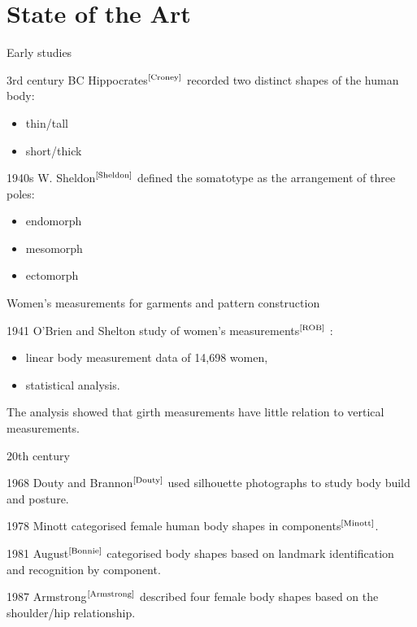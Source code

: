 \documentclass[10pt]{beamer}
\newcommand{\bib}[1]{$^\text{\cite{#1}}$}
\begin{document}
\section{State of the Art}
\begin{frame}{Early studies}
	\begin{block}{3rd century BC}
		Hippocrates\bib{Croney} recorded two distinct shapes of the human body:
		\begin{itemize}
			\item thin/tall
			\item short/thick
		\end{itemize} \pause
	\end{block}\pause
	\begin{block}{1940s}
		W. Sheldon\bib{Sheldon} defined the somatotype as the arrangement of three poles:
		\begin{itemize}
			\item endomorph
			\item mesomorph
			\item ectomorph
		\end{itemize}
	\end{block}
\end{frame}

\begin{frame}{Women's measurements for garments and pattern construction}
	\begin{block}{1941}
		O’Brien and Shelton study of women’s measurements\bib{ROB} :
		\begin{itemize}
			\item linear body measurement data of 14,698 women,
			\item statistical analysis.
		\end{itemize}\pause
		The analysis showed that girth measurements have little relation to vertical measurements.
	\end{block}
\end{frame}

\begin{frame}{20th century}
	\begin{block}{1968}
		Douty and Brannon\bib{Douty} used silhouette photographs to study body build and posture.
	\end{block}\pause
	\begin{block}{1978}
		Minott categorised female human body shapes in components\bib{Minott}.
	\end{block}\pause
	\begin{block}{1981} August\bib{Bonnie} categorised body shapes based on landmark identification and recognition by component.
	\end{block}\pause
	\begin{block}{1987}
		Armstrong\bib{Armstrong} described four female body shapes based on the shoulder/hip relationship.
	\end{block}
\end{frame}
\end{document}

